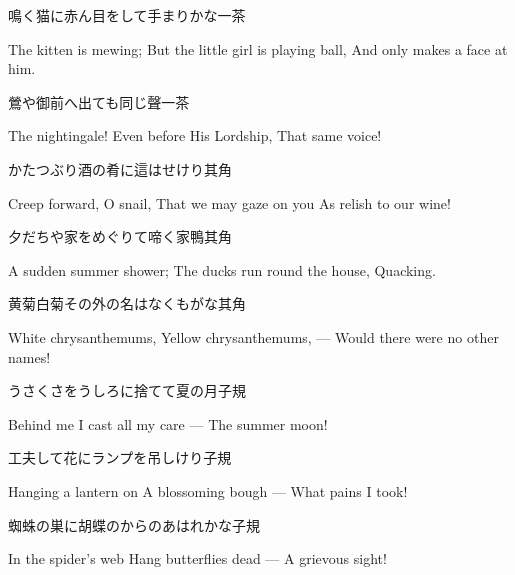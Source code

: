 \begin{haiku}
    {\FH 鳴く猫に赤ん目をして手まりかな}\hfill{\FH 一茶}

    \vin{} The kitten is mewing;
    \vin{} \vin{} But the little girl is playing ball,
    \vin{} \vin{} \vin{} And only makes a face at him.
\end{haiku}

\begin{haiku}
    {\FH 鶯や御前へ出ても同じ聲}\hfill{\FH 一茶}

    \vin{} The nightingale!
    \vin{} \vin{} Even before His Lordship,
    \vin{} \vin{} \vin{} That same voice!
\end{haiku}

\begin{haiku}
    {\FH かたつぶり酒の肴に這はせけり}\hfill{\FH 其角}

    \vin{} Creep forward, O snail,
    \vin{} \vin{} That we may gaze on you
    \vin{} \vin{} \vin{} As relish to our wine!
\end{haiku}

\begin{haiku}
    {\FH 夕だちや家をめぐりて啼く家鴨}\hfill{\FH 其角}

    \vin{} A sudden summer shower;
    \vin{} \vin{} The ducks run round the house,
    \vin{} \vin{} \vin{} Quacking.
\end{haiku}

\begin{haiku}
    {\FH 黄菊白菊その外の名はなくもがな}\hfill{\FH 其角}

    \vin{} White chrysanthemums,
    \vin{} \vin{} Yellow chrysanthemums, ---
    \vin{} \vin{} \vin{} Would there were no other names!
\end{haiku}

\begin{haiku}
    {\FH うさくさをうしろに捨てて夏の月}\hfill{\FH 子規}

    \vin{} Behind me
    \vin{} \vin{} I cast all my care ---
    \vin{} \vin{} \vin{} The summer moon!
\end{haiku}

\begin{haiku}
    {\FH 工夫して花にランプを吊しけり}\hfill{\FH 子規}

    \vin{} Hanging a lantern on
    \vin{} \vin{} A blossoming bough ---
    \vin{} \vin{} \vin{} What pains I took!
\end{haiku}

\begin{haiku}
    {\FH 蜘蛛の巣に胡蝶のからのあはれかな}\hfill{\FH 子規}

    \vin{} In the spider's web
    \vin{} \vin{} Hang butterflies dead ---
    \vin{} \vin{} \vin{} A grievous sight!
\end{haiku}

